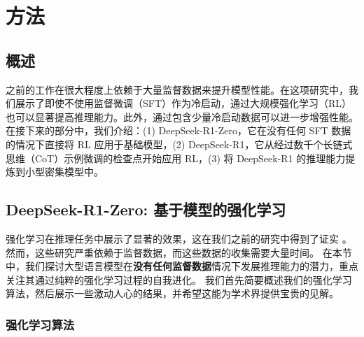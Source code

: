 \documentclass[11pt, a4paper, logo, copyright, nonumbering]{deepseek}
\newcommand{\dsri}{DeepSeek-R1}
\newcommand{\dsro}{DeepSeek-R1-Zero}
\begin{document}
\section{方法}
\subsection{概述}
之前的工作在很大程度上依赖于大量监督数据来提升模型性能。在这项研究中，我们展示了即使不使用监督微调（SFT）作为冷启动，通过大规模强化学习（RL）也可以显著提高推理能力。此外，通过包含少量冷启动数据可以进一步增强性能。在接下来的部分中，我们介绍：(1) \dsro{}，它在没有任何 SFT 数据的情况下直接将 RL 应用于基础模型，(2) \dsri{}，它从经过数千个长链式思维（CoT）示例微调的检查点开始应用 RL，(3) 将 \dsri{} 的推理能力提炼到小型密集模型中。
\subsection{ \dsro{}: 基于模型的强化学习}
\label{sec:ds-zero}
强化学习在推理任务中展示了显著的效果，这在我们之前的研究中得到了证实 \citep{mathshepherd,deepseekmath}。
然而，这些研究严重依赖于监督数据，而这些数据的收集需要大量时间。
在本节中，我们探讨大型语言模型在\textbf{没有任何监督数据}情况下发展推理能力的潜力，重点关注其通过纯粹的强化学习过程的自我进化。
我们首先简要概述我们的强化学习算法，然后展示一些激动人心的结果，并希望这能为学术界提供宝贵的见解。
\subsubsection{强化学习算法}
\end{document}
